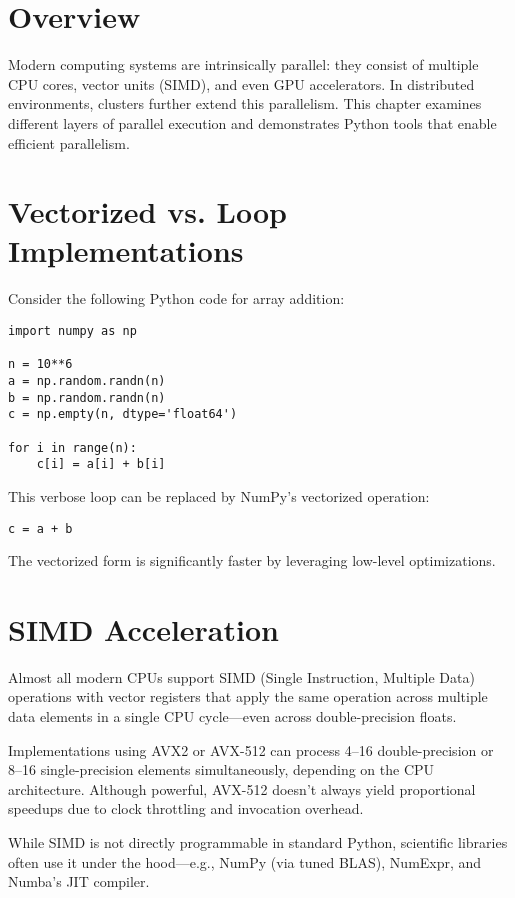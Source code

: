 \documentclass[11pt,a4paper]{book}
\begin{document}
\section*{Overview}
Modern computing systems are intrinsically parallel: they consist of multiple CPU cores, vector units (SIMD), and even GPU accelerators. In distributed environments, clusters further extend this parallelism. This chapter examines different layers of parallel execution and demonstrates Python tools that enable efficient parallelism.

\section{Vectorized vs. Loop Implementations}
Consider the following Python code for array addition:

\begin{lstlisting}
import numpy as np

n = 10**6
a = np.random.randn(n)
b = np.random.randn(n)
c = np.empty(n, dtype='float64')

for i in range(n):
    c[i] = a[i] + b[i]
\end{lstlisting}

This verbose loop can be replaced by NumPy's vectorized operation:

\begin{lstlisting}
c = a + b
\end{lstlisting}

The vectorized form is significantly faster by leveraging low-level optimizations.

\section{SIMD Acceleration}

Almost all modern CPUs support SIMD (Single Instruction, Multiple Data) operations with vector registers that apply the same operation across multiple data elements in a single CPU cycle—even across double-precision floats.

Implementations using AVX2 or AVX-512 can process 4–16 double-precision or 8–16 single-precision elements simultaneously, depending on the CPU architecture. Although powerful, AVX-512 doesn't always yield proportional speedups due to clock throttling and invocation overhead.

While SIMD is not directly programmable in standard Python, scientific libraries often use it under the hood—e.g., NumPy (via tuned BLAS), NumExpr, and Numba's JIT compiler.
\end{document}
